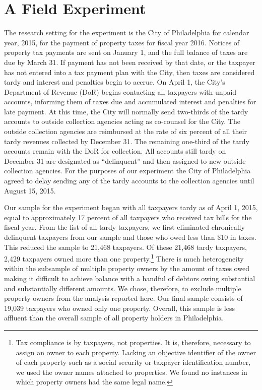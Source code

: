 \documentclass[12pt]{article}
\begin{document}
\section{A Field Experiment }

The research setting for the experiment is the City of Philadelphia
for calendar year, 2015, for the payment of property taxes for fiscal
year 2016.  Notices of property tax payments are sent on
January 1, and the full balance of taxes are due by March 31.  If
payment has not been received by that date, or the taxpayer has not
entered into a tax payment plan with the City, then taxes are
considered tardy and interest and penalties begin to accrue.  On April
1, the City's Department of Revenue (DoR) begins contacting all
taxpayers with unpaid accounts, informing them of taxes due and
accumulated interest and penalties for late payment.  At this time,
the City will normally send two-thirds of the tardy accounts to
outside collection agencies acting as co-counsel for the City. The
outside collection agencies are reimbursed at the rate of six percent
of all their tardy revenues collected by December 31. The remaining
one-third of the tardy accounts remain with the DoR for
collection. All accounts still tardy on December 31 are designated as
``delinquent'' and then assigned to new outside collection
agencies. For the purposes of our experiment the City of Philadelphia
agreed to delay sending any of the tardy accounts to the collection
agencies until August 15, 2015.

Our sample for the experiment began with all taxpayers tardy as of
April 1, 2015, equal to approximately 17 percent of all taxpayers who
received tax bills for the fiscal year.  From the list of all
tardy taxpayers, we first eliminated chronically delinquent taxpayers
from our sample and those who owed less than \$10 in taxes. This
reduced the sample to 21,468 taxpayers. Of these 21,468 tardy
taxpayers, 2,429 taxpayers owned more than one property.\footnote{Tax
  compliance is by taxpayers, not properties.  It is, therefore,
  necessary to assign an owner to each property. Lacking an objective
  identifier of the owner of each property such as a social security
  or taxpayer identification number, we used the owner names attached
  to properties.  We found no instances in which property owners had
  the same legal name.} There is much heterogeneity within the
subsample of multiple property owners by the amount of taxes owed
making it difficult to achieve balance with a handful of debtors owing
substantial and substantially different amounts. We chose, therefore,
to exclude multiple property owners from the analysis reported here.
Our final sample consists of 19,039 taxpayers who owned only one
property. Overall, this sample is less affluent than the overall
sample of all property holders in Philadelphia.
\end{document}
